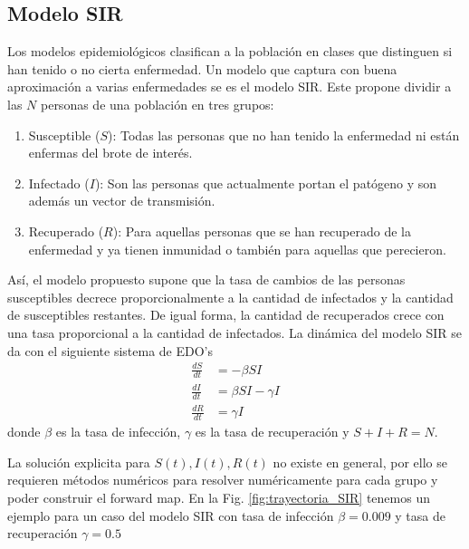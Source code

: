 \subsection{Modelo SIR}

Los modelos epidemiológicos clasifican a la población en clases que distinguen si han tenido o no cierta enfermedad. Un modelo que captura con buena aproximación a varias enfermedades se es el modelo SIR. Este propone dividir a las $N$ personas de una población en tres grupos:
\begin{enumerate}
    \item Susceptible ($S$): Todas las personas que no han tenido la enfermedad ni están enfermas del brote de interés.
    \item Infectado ($I$): Son las personas que actualmente portan el patógeno y son además un vector de transmisión.
    \item Recuperado ($R$): Para aquellas personas que se han recuperado de la enfermedad y ya tienen inmunidad o también para aquellas que perecieron.
\end{enumerate}

Así, el modelo propuesto supone que la tasa de cambios de las personas susceptibles decrece proporcionalmente a la cantidad de infectados y la cantidad de susceptibles restantes. De igual forma, la cantidad de recuperados crece con una tasa proporcional a la cantidad de infectados. La dinámica del modelo SIR se da con el siguiente sistema de EDO's
\begin{align}
    \frac{dS}{dt} &= -\beta S I \nonumber \\
    \frac{dI}{dt} &= \beta S I - \gamma I\\
    \frac{dR}{dt} &= \gamma I \nonumber
\end{align}
donde $\beta$ es la tasa de infección, $\gamma$ es la tasa de recuperación y $S + I + R = N$.

La solución explicita para $S(t), I(t), R(t)$ no existe en general, por ello se requieren métodos numéricos para resolver numéricamente para cada grupo y poder construir el forward map. En la Fig. \ref{fig:trayectoria_SIR} tenemos un ejemplo para un caso del modelo SIR con tasa de infección $\beta = 0.009$ y tasa de recuperación $\gamma = 0.5$


